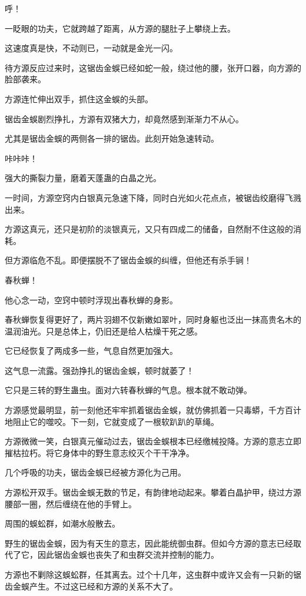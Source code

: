 \begin{this_body}
呼！

一眨眼的功夫，它就跨越了距离，从方源的腿肚子上攀绕上去。

这速度真是快，不动则已，一动就是金光一闪。

待方源反应过来时，这锯齿金蜈已经如蛇一般，绕过他的腰，张开口器，向方源的脸部袭来。

方源连忙伸出双手，抓住这金蜈的头部。

锯齿金蜈剧烈挣扎，方源有双猪大力，却竟然感到渐渐力不从心。

尤其是锯齿金蜈的两侧各一排的锯齿。此刻开始急速转动。

咔咔咔！

强大的撕裂力量，磨着天蓬蛊的白晶之光。

一时间，方源空窍内白银真元急速下降，同时白光如火花点点，被锯齿绞磨得飞溅出来。

方源这真元，还只是初阶的淡银真元，又只有四成二的储备，自然耐不住这般的消耗。

但方源临危不乱。即便摆脱不了锯齿金蜈的纠缠，但他还有杀手锏！

春秋蝉！

他心念一动，空窍中顿时浮现出春秋蝉的身影。

春秋蝉恢复得更好了，两片羽翅不仅新嫩如翠叶，同时身躯也泛出一抹高贵名木的温润油光。只是总体上，仍旧还是给人枯燥干死之感。

它已经恢复了两成多一些，气息自然更加强大。

这气息一流露。强劲挣扎的锯齿金蜈，顿时就萎了！

它只是三转的野生蛊虫。面对六转春秋蝉的气息。根本就不敢动弹。

方源感觉最明显，前一刻他还牢牢抓着锯齿金蜈，就仿佛抓着一只毒蟒，千方百计地阻止它的噬咬。下一刻，它就变成了一根软趴趴的草绳。

方源微微一笑，白银真元催动过去，锯齿金蜈根本已经缴械投降。方源的意志立即摧枯拉朽。将它身体中的野生意志绞灭个干干净净。

几个呼吸的功夫，锯齿金蜈已经被方源化为己用。

方源松开双手。锯齿金蜈无数的节足，有韵律地动起来。攀着白晶护甲，绕过方源腰部一圈，然后缠绕在他的手臂上。

周围的蜈蚣群，如潮水般散去。

野生的锯齿金蜈，因为有天生的意志，因此能统御虫群。但如今方源的意志已经取代了它，因此锯齿金蜈也丧失了和虫群交流并控制的能力。

方源也不剿除这蜈蚣群，任其离去。过个十几年，这虫群中或许又会有一只新的锯齿金蜈产生。不过这已经和方源的关系不大了。


\end{this_body}

